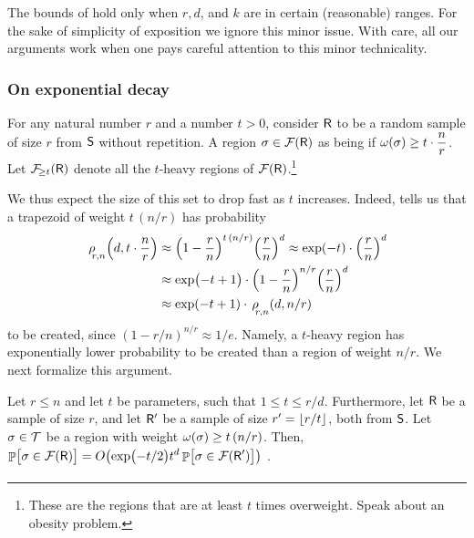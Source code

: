 \begin{remark}
    The bounds of  hold only when $r, d$, and
    $k$ are in certain (reasonable) ranges. For the sake of simplicity
    of exposition we ignore this minor issue. With care, all our
    arguments work when one pays careful attention to this minor
    technicality.
\end{remark}



\subsubsection{On exponential decay}

For any natural number $r$ and a number $t >0$, consider $\mathsf{R}$ to
be a random sample  of size $r$ from $\mathsf{S}$
without repetition.  A region $\Trap \in \RegionsSet{\Sample}$ as
being  if
$\WeightX{\Trap} \geq t \ds \cdot \frac{ n}{r}$. Let
$\RegionsHeavy{t}{\Sample}$ denote all the $t$-heavy regions of
$\RegionsSet{\Sample}$.\footnote{These are the regions that are at
   least $t$ times overweight. Speak about an obesity problem.} %

We thus expect the size of this set to drop fast as $t$
increases. Indeed,  tells us that a trapezoid
of weight $t\, (n/r)$ has probability
\begin{align*}
    \CSProbFull{r}{d}{t\cdot \frac{n}{r}}{n}%
    &\approx %
    \pth{1-\frac{r}{n}}^{t\,(n/r)} \pth{\frac{r}{n}}^d %
    \approx %
    \exp\pth{-t} \cdot \pth{\frac{r}{n}}^d %
    \\
    &\approx %
    \exp\pth{\bigl.-t+1} \cdot \pth{1-\frac{r}{n}}^{n/r}
    \pth{\frac{r}{n}}^d%
    \\
    &\approx %
    \exp\pth{-t+1} \cdot \CSProbFull{r}{d}{n/r}{n}
\end{align*}
to be created, since $(1-r/n)^{n/r} \approx 1/e$. Namely, a $t$-heavy
region has exponentially lower probability to be created than a region
of weight $n/r$. We next formalize this argument.




\begin{lemma}
    Let $r \leq n$ and let $t$ be parameters, such that
    $1 \leq t \leq r/d$. Furthermore, let $\mathsf{R}$ be a sample of
    size $r$, and let $\mathsf{R}'$ be a sample of size $r'=\left\lfloor {r/t} \right\rfloor$,
    both from $\mathsf{S}$.  Let $\sigma \in \mathcal{T}$ be a region with
    weight $\WeightX{\Trap} \geq t\,(n/r)$.  Then,
    \begin{math}
        \Bigl.\ds \Prob{\bigl. \Trap \in \RegionsSet{\Sample}} =
        O\pth{ \exp\pth{-{t}/{2}\bigr.} t^d \,{\Prob{\bigl. \Trap \in
                 \RegionsSet{\SampleA}} } }
\end{math}
.
\end{lemma}


